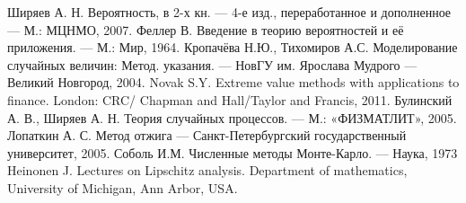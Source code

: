 \documentclass[a4paper, 11pt]{article}
\theoremstyle{def}
\theoremstyle{th}
\theoremstyle{rem}
\begin{document}
\clearpage
\begin{thebibliography}{9}
    Ширяев А. Н. Вероятность, в 2-х кн. --- 4-е изд., переработанное и дополненное --- М.: МЦНМО, 2007.
     Феллер В. Введение в теорию вероятностей и её приложения. --- М.: Мир, 1964.
     Кропачёва Н.Ю., Тихомиров А.С. Моделирование случайных величин: Метод. указания. --- НовГУ им. Ярослава Мудрого --- Великий Новгород, 2004.
     Novak S.Y. Extreme value methods with applications to finance. London: CRC/ Chapman and Hall/Taylor and Francis, 2011.
     Булинский А. В., Ширяев А. Н. Теория случайных процессов. --- М.: «ФИЗМАТЛИТ», 2005.
     Лопаткин А. С. Метод отжига --- Санкт-Петербургский государственный университет, 2005.
     Соболь И.М. Численные методы Монте-Карло. --- Наука, 1973
     Heinonen J. Lectures on Lipschitz analysis. Department of mathematics, University of Michigan, Ann Arbor, USA.
\end{thebibliography}
\end{document}
